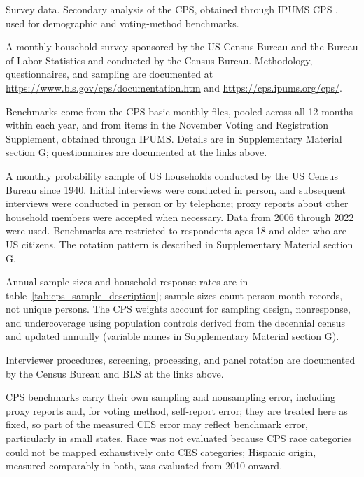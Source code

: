 \documentclass[12pt]{article}
\begin{document}
\begin{description}[style=unboxed, leftmargin=0pt, font=\normalfont\bfseries]
\item[Data Source:] Survey data. Secondary analysis of the CPS, obtained through IPUMS CPS \parencite{flood_ipums_2024}, used for demographic and voting-method benchmarks.

\item[Data Collection Strategy, Sponsor, and Conductor:] A monthly household survey sponsored by the US Census Bureau and the Bureau of Labor Statistics and conducted by the Census Bureau. Methodology, questionnaires, and sampling are documented at \url{https://www.bls.gov/cps/documentation.htm} and \url{https://cps.ipums.org/cps/}.

\item[Measurement Tools/Instruments:] Benchmarks come from the CPS basic monthly files, pooled across all 12 months within each year, and from items in the November Voting and Registration Supplement, obtained through IPUMS. Details are in Supplementary Material section G; questionnaires are documented at the links above.

\item[Population, Sample, Mode, and Dates:] A monthly probability sample of US households conducted by the US Census Bureau since 1940. Initial interviews were conducted in person, and subsequent interviews were conducted in person or by telephone; proxy reports about other household members were accepted when necessary. Data from 2006 through 2022 were used. Benchmarks are restricted to respondents ages 18 and older who are US citizens. The rotation pattern is described in Supplementary Material section G.

\item[Sample Sizes, Response Rates, and Weighting:] Annual sample sizes and household response rates are in table~\ref{tab:cps_sample_description}; sample sizes count person-month records, not unique persons. The CPS weights account for sampling design, nonresponse, and undercoverage using population controls derived from the decennial census and updated annually (variable names in Supplementary Material section G).

\item[Other Elements:] Interviewer procedures, screening, processing, and panel rotation are documented by the Census Bureau and BLS at the links above.

\item[Limitations:] CPS benchmarks carry their own sampling and nonsampling error, including proxy reports and, for voting method, self-report error; they are treated here as fixed, so part of the measured CES error may reflect benchmark error, particularly in small states. Race was not evaluated because CPS race categories could not be mapped exhaustively onto CES categories; Hispanic origin, measured comparably in both, was evaluated from 2010 onward.
\end{description}
\end{document}
